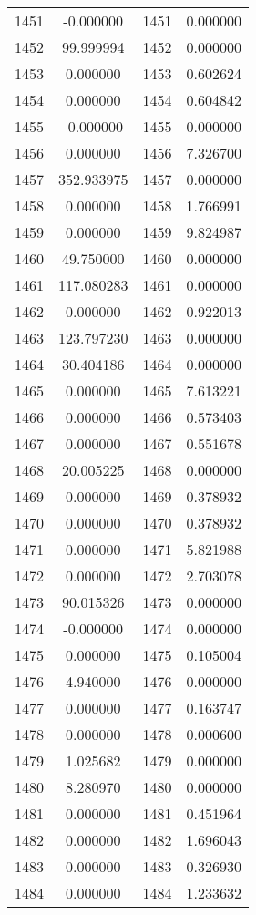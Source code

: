 \documentclass[12pt]{article}
\begin{document}
\begin{longtable}{@{}cccc@{}}
1451 & -0.000000 & 1451 & 0.000000 \\
1452 & 99.999994 & 1452 & 0.000000 \\
1453 & 0.000000 & 1453 & 0.602624 \\
1454 & 0.000000 & 1454 & 0.604842 \\
1455 & -0.000000 & 1455 & 0.000000 \\
1456 & 0.000000 & 1456 & 7.326700 \\
1457 & 352.933975 & 1457 & 0.000000 \\
1458 & 0.000000 & 1458 & 1.766991 \\
1459 & 0.000000 & 1459 & 9.824987 \\
1460 & 49.750000 & 1460 & 0.000000 \\
1461 & 117.080283 & 1461 & 0.000000 \\
1462 & 0.000000 & 1462 & 0.922013 \\
1463 & 123.797230 & 1463 & 0.000000 \\
1464 & 30.404186 & 1464 & 0.000000 \\
1465 & 0.000000 & 1465 & 7.613221 \\
1466 & 0.000000 & 1466 & 0.573403 \\
1467 & 0.000000 & 1467 & 0.551678 \\
1468 & 20.005225 & 1468 & 0.000000 \\
1469 & 0.000000 & 1469 & 0.378932 \\
1470 & 0.000000 & 1470 & 0.378932 \\
1471 & 0.000000 & 1471 & 5.821988 \\
1472 & 0.000000 & 1472 & 2.703078 \\
1473 & 90.015326 & 1473 & 0.000000 \\
1474 & -0.000000 & 1474 & 0.000000 \\
1475 & 0.000000 & 1475 & 0.105004 \\
1476 & 4.940000 & 1476 & 0.000000 \\
1477 & 0.000000 & 1477 & 0.163747 \\
1478 & 0.000000 & 1478 & 0.000600 \\
1479 & 1.025682 & 1479 & 0.000000 \\
1480 & 8.280970 & 1480 & 0.000000 \\
1481 & 0.000000 & 1481 & 0.451964 \\
1482 & 0.000000 & 1482 & 1.696043 \\
1483 & 0.000000 & 1483 & 0.326930 \\
1484 & 0.000000 & 1484 & 1.233632 \\

\end{longtable}
\end{document}
